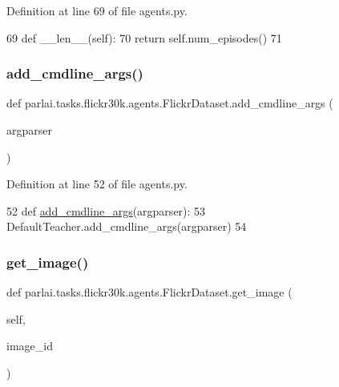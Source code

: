 Definition at line 69 of file agents.\+py.


\begin{DoxyCode}
69     \textcolor{keyword}{def }\_\_len\_\_(self):
70         \textcolor{keywordflow}{return} self.num\_episodes()
71 
\end{DoxyCode}
\mbox{\label{classparlai_1_1tasks_1_1flickr30k_1_1agents_1_1FlickrDataset_a2dd3179eae6116b6b43567fc8e4ecc3c}} 
\subsubsection{\texorpdfstring{add\+\_\+cmdline\+\_\+args()}{add\_cmdline\_args()}}
{\footnotesize\ttfamily def parlai.\+tasks.\+flickr30k.\+agents.\+Flickr\+Dataset.\+add\+\_\+cmdline\+\_\+args (\begin{DoxyParamCaption}\item[{}]{argparser }\end{DoxyParamCaption})\hspace{0.3cm}{\ttfamily [static]}}



Definition at line 52 of file agents.\+py.


\begin{DoxyCode}
52     \textcolor{keyword}{def }\hyperlink{namespaceparlai_1_1agents_1_1drqa_1_1config_a62fdd5554f1da6be0cba185271058320}{add\_cmdline\_args}(argparser):
53         DefaultTeacher.add\_cmdline\_args(argparser)
54 
\end{DoxyCode}
\mbox{\label{classparlai_1_1tasks_1_1flickr30k_1_1agents_1_1FlickrDataset_af2517dc3b4a7670305ad9a517a8d49c1}} 
\subsubsection{\texorpdfstring{get\+\_\+image()}{get\_image()}}
{\footnotesize\ttfamily def parlai.\+tasks.\+flickr30k.\+agents.\+Flickr\+Dataset.\+get\+\_\+image (\begin{DoxyParamCaption}\item[{}]{self,  }\item[{}]{image\+\_\+id }\end{DoxyParamCaption})}



